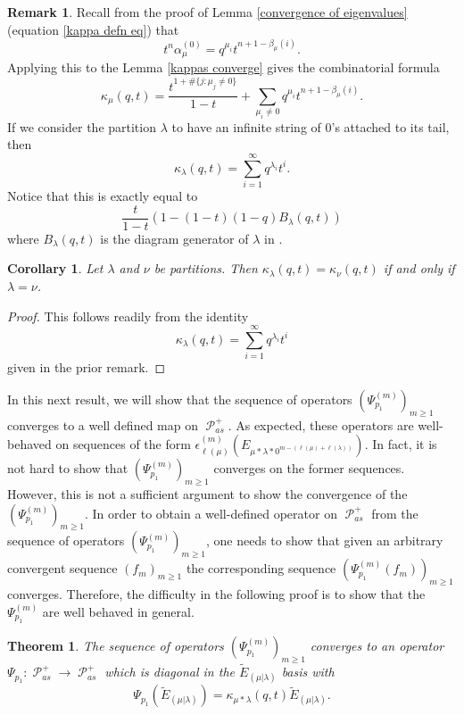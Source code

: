 \documentclass[11pt]{article}
\newtheorem{thm}[theo]{Theorem}
\newtheorem{coro}[theo]{Corollary}
\theoremstyle{definition}
\newtheorem{rema}[theo]{Remark}
\numberwithin{equation}{section}
\DeclareMathOperator{\sP}{\mathscr{P} }
\begin{document}
\begin{rema}
    Recall from the proof of Lemma \ref{convergence of eigenvalues} (equation \eqref{kappa defn eq}) that 
    $$t^n\alpha_{\mu}^{(0)} = q^{\mu_i}t^{n+1-\beta_{\mu}(i)}.$$ Applying this to the Lemma \ref{kappas converge} gives the combinatorial formula 
    $$\kappa_{\mu}(q,t) = \frac{t^{1+\#\{j:\mu_j \neq 0\}}}{1-t}+ \sum_{\mu_i \neq 0} q^{\mu_i}t^{n+1- \beta_{\mu}(i)}.$$ If we consider the partition $\lambda$ to have an infinite string of $0$'s attached to its tail, then 
    $$\kappa_{\lambda}(q,t) = \sum_{i=1}^{\infty} q^{\lambda_i}t^{i}.$$ Notice that this is exactly equal to 
    $$\frac{t}{1-t}\left(1 - (1-t)(1-q)B_{\lambda}(q,t) \right)$$ where $B_{\lambda}(q,t)$ is the diagram generator of $\lambda$ in \cite[Section 2, (2.12), page 7]{HMacDG}.
\end{rema}

\begin{coro}
    Let $\lambda$ and $\nu$ be partitions. Then $\kappa_{\lambda}(q,t) = \kappa_{\nu}(q,t)$ if and only if $\lambda = \nu$.
\end{coro}
\begin{proof}
    This follows readily from the identity 
    $$\kappa_{\lambda}(q,t) =  \sum_{i=1}^{\infty} q^{\lambda_i}t^{i}$$ given in the prior remark. 
\end{proof}

In this next result, we will show that the sequence of operators $(\Psi_{p_1}^{(m)})_{m\geq 1}$ converges to a well defined map on $\sP_{as}^{+}$. As expected, these operators are well-behaved on sequences of the form $\epsilon_{\ell(\mu)}^{(m)}(E_{\mu*\lambda*0^{m-(\ell(\mu)+\ell(\lambda))}}).$ In fact, it is not hard to show that $(\Psi_{p_1}^{(m)})_{m\geq 1}$ converges on the former sequences. However, this is not a sufficient argument to show the convergence of the $(\Psi_{p_1}^{(m)})_{m\geq 1}$. In order to obtain a well-defined operator on $\sP_{as}^{+}$ from the sequence of operators $(\Psi_{p_1}^{(m)})_{m\geq 1}$, one needs to show that given an arbitrary convergent sequence $(f_m)_{m\geq 1}$ the corresponding sequence $(\Psi_{p_1}^{(m)}(f_m))_{m\geq 1}$ converges. Therefore, the difficulty in the following proof is to show that the $\Psi_{p_1}^{(m)}$ are well behaved in general.


\begin{thm}\label{psi 1 converges}
    The sequence of operators $(\Psi_{p_1}^{(m)})_{m\geq 1}$ converges to an operator $\Psi_{p_1}: \sP_{as}^{+}\rightarrow \sP_{as}^{+}$ which is diagonal in the $\widetilde{E}_{(\mu|\lambda)}$ basis with 
    \begin{equation}
        \Psi_{p_1}(\widetilde{E}_{(\mu|\lambda)}) = \kappa_{\mu*\lambda}(q,t) \widetilde{E}_{(\mu|\lambda)}.
    \end{equation}
    
\end{thm}
\end{document}
